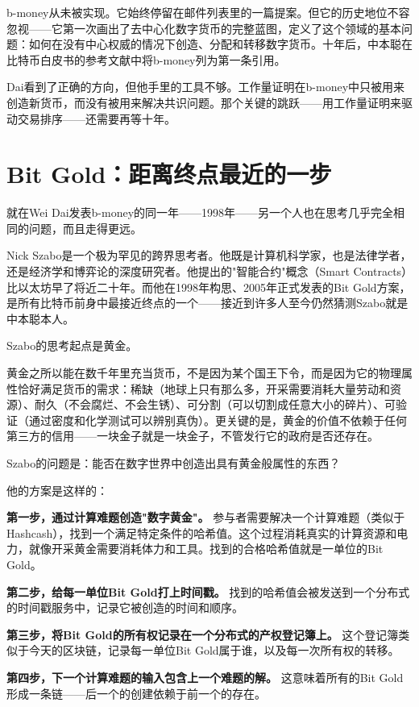 \documentclass[a4paper,12pt,openany]{ctexbook}
\begin{document}
b-money从未被实现。它始终停留在邮件列表里的一篇提案。但它的历史地位不容忽视——它第一次画出了去中心化数字货币的完整蓝图，定义了这个领域的基本问题：如何在没有中心权威的情况下创造、分配和转移数字货币。十年后，中本聪在比特币白皮书的参考文献中将b-money列为第一条引用。

Dai看到了正确的方向，但他手里的工具不够。工作量证明在b-money中只被用来创造新货币，而没有被用来解决共识问题。那个关键的跳跃——用工作量证明来驱动交易排序——还需要再等十年。


\section*{Bit Gold：距离终点最近的一步}


就在Wei Dai发表b-money的同一年——1998年——另一个人也在思考几乎完全相同的问题，而且走得更远。

Nick Szabo是一个极为罕见的跨界思考者。他既是计算机科学家，也是法律学者，还是经济学和博弈论的深度研究者。他提出的"智能合约"概念（Smart Contracts）比以太坊早了将近二十年。而他在1998年构思、2005年正式发表的Bit Gold方案，是所有比特币前身中最接近终点的一个——接近到许多人至今仍然猜测Szabo就是中本聪本人。

Szabo的思考起点是黄金。

黄金之所以能在数千年里充当货币，不是因为某个国王下令，而是因为它的物理属性恰好满足货币的需求：稀缺（地球上只有那么多，开采需要消耗大量劳动和资源）、耐久（不会腐烂、不会生锈）、可分割（可以切割成任意大小的碎片）、可验证（通过密度和化学测试可以辨别真伪）。更关键的是，黄金的价值不依赖于任何第三方的信用——一块金子就是一块金子，不管发行它的政府是否还存在。

Szabo的问题是：能否在数字世界中创造出具有黄金般属性的东西？

他的方案是这样的：

\textbf{第一步，通过计算难题创造"数字黄金"。} 参与者需要解决一个计算难题（类似于Hashcash），找到一个满足特定条件的哈希值。这个过程消耗真实的计算资源和电力，就像开采黄金需要消耗体力和工具。找到的合格哈希值就是一单位的Bit Gold。

\textbf{第二步，给每一单位Bit Gold打上时间戳。} 找到的哈希值会被发送到一个分布式的时间戳服务中，记录它被创造的时间和顺序。

\textbf{第三步，将Bit Gold的所有权记录在一个分布式的产权登记簿上。} 这个登记簿类似于今天的区块链，记录每一单位Bit Gold属于谁，以及每一次所有权的转移。

\textbf{第四步，下一个计算难题的输入包含上一个难题的解。} 这意味着所有的Bit Gold形成一条链——后一个的创建依赖于前一个的存在。
\end{document}

